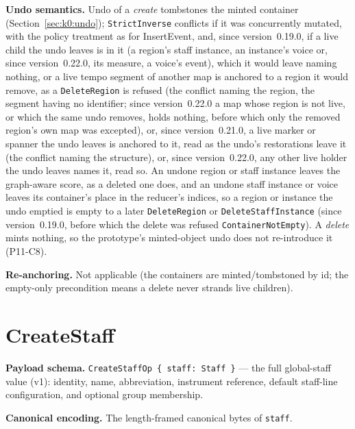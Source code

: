 \documentclass[11pt,letterpaper]{report}
\begin{document}
\textbf{Undo semantics.} Undo of a \emph{create} tombstones the minted container
(Section~\ref{sec:k0:undo}); \texttt{StrictInverse} conflicts if it was
concurrently mutated, with the policy treatment as for InsertEvent, and, since
version~0.19.0, if a live child the undo leaves is in it (a region's staff
instance, an instance's voice or, since version~0.22.0, its measure, a voice's
event), which it would leave naming
nothing, or a live tempo segment of another map is anchored to a region it
would remove, as a \texttt{DeleteRegion} is refused (the conflict naming the
region, the segment having no identifier; since version~0.22.0 a map whose
region is not live, or which the same undo removes, holds nothing, before
which only the removed region's own map was excepted), or, since version~0.21.0, a live
marker or spanner the undo leaves is anchored to it, read as the undo's
restorations leave it (the conflict naming the structure), or, since
version~0.22.0, any other live holder the undo leaves names it, read so. An undone region or staff instance leaves the graph-aware score, as a
deleted one does, and an undone staff instance or voice leaves its container's
place in the reducer's indices, so a region or instance the undo emptied is
empty to a later \texttt{DeleteRegion} or \texttt{DeleteStaffInstance}
(since version~0.19.0, before which the delete was refused
\texttt{ContainerNotEmpty}). A
\emph{delete} mints nothing, so the prototype's minted-object undo does not
re-introduce it (P11-C8).

\textbf{Re-anchoring.} Not applicable (the containers are minted/tombstoned by id;
the empty-only precondition means a delete never strands live children).

\section{CreateStaff}
\label{sec:k0:create-staff}

\textbf{Payload schema.} \texttt{CreateStaffOp \{ staff: Staff \}} --- the full
global-staff value (v1): identity, name, abbreviation, instrument reference,
default staff-line configuration, and optional group membership.

\textbf{Canonical encoding.} The length-framed canonical bytes of
\texttt{staff}.
\end{document}
